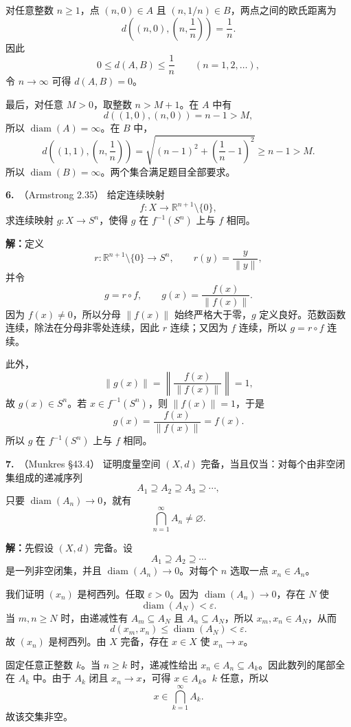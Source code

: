 \documentclass{article}
\newcommand{\R}{\mathbb R}
\newcommand{\problem}[2]{\par\medskip\noindent\textbf{#1.}\ （#2）\quad}
\newcommand{\solution}{\par\noindent\textbf{解：}}
\begin{document}
对任意整数 $n\ge1$，点 $(n,0)\in A$ 且 $(n,1/n)\in B$，两点之间的欧氏距离为
\[
  d\left((n,0),\left(n,\frac1n\right)\right)=\frac1n.
\]
因此
\[
  0\le d(A,B)\le\frac1n\qquad(n=1,2,\ldots),
\]
令 $n\to\infty$ 可得 $d(A,B)=0$。

最后，对任意 $M>0$，取整数 $n>M+1$。在 $A$ 中有
\[
  d((1,0),(n,0))=n-1>M,
\]
所以 $\operatorname{diam}(A)=\infty$。在 $B$ 中，
\[
  d\left((1,1),\left(n,\frac1n\right)\right)
  =\sqrt{(n-1)^2+\left(\frac1n-1\right)^2}
  \ge n-1>M.
\]
所以 $\operatorname{diam}(B)=\infty$。两个集合满足题目全部要求。

\problem{6}{Armstrong 2.35}
给定连续映射
\[
  f:X\longrightarrow\R^{n+1}\setminus\{0\},
\]
求连续映射 $g:X\to S^n$，使得 $g$ 在 $f^{-1}(S^n)$ 上与 $f$ 相同。


\solution 定义
\[
  r:\R^{n+1}\setminus\{0\}\longrightarrow S^n,
  \qquad
  r(y)=\frac{y}{\lVert y\rVert},
\]
并令
\[
  g=r\circ f,
  \qquad
  g(x)=\frac{f(x)}{\lVert f(x)\rVert}.
\]
因为 $f(x)\ne0$，所以分母 $\lVert f(x)\rVert$ 始终严格大于零，$g$ 定义良好。范数函数连续，除法在分母非零处连续，因此 $r$ 连续；又因为 $f$ 连续，所以 $g=r\circ f$ 连续。

此外，
\[
  \lVert g(x)\rVert
  =\left\lVert\frac{f(x)}{\lVert f(x)\rVert}\right\rVert=1,
\]
故 $g(x)\in S^n$。若 $x\in f^{-1}(S^n)$，则 $\lVert f(x)\rVert=1$，于是
\[
  g(x)=\frac{f(x)}{\lVert f(x)\rVert}=f(x).
\]
所以 $g$ 在 $f^{-1}(S^n)$ 上与 $f$ 相同。

\problem{7}{Munkres §43.4}
证明度量空间 $(X,d)$ 完备，当且仅当：对每个由非空闭集组成的递减序列
\[
  A_1\supseteq A_2\supseteq A_3\supseteq\cdots,
\]
只要 $\operatorname{diam}(A_n)\to0$，就有
\[
  \bigcap_{n=1}^{\infty}A_n\ne\varnothing.
\]

\solution 先假设 $(X,d)$ 完备。设
\[
  A_1\supseteq A_2\supseteq\cdots
\]
是一列非空闭集，并且 $\operatorname{diam}(A_n)\to0$。对每个 $n$ 选取一点 $x_n\in A_n$。

我们证明 $(x_n)$ 是柯西列。任取 $\varepsilon>0$。因为 $\operatorname{diam}(A_n)\to0$，存在 $N$ 使
\[
  \operatorname{diam}(A_N)<\varepsilon.
\]
当 $m,n\ge N$ 时，由递减性有 $A_m\subseteq A_N$ 且 $A_n\subseteq A_N$，所以 $x_m,x_n\in A_N$，从而
\[
  d(x_m,x_n)\le\operatorname{diam}(A_N)<\varepsilon.
\]
故 $(x_n)$ 是柯西列。由 $X$ 完备，存在 $x\in X$ 使 $x_n\to x$。

固定任意正整数 $k$。当 $n\ge k$ 时，递减性给出 $x_n\in A_n\subseteq A_k$。因此数列的尾部全在 $A_k$ 中。由于 $A_k$ 闭且 $x_n\to x$，可得 $x\in A_k$。$k$ 任意，所以
\[
  x\in\bigcap_{k=1}^{\infty}A_k.
\]
故该交集非空。
\end{document}
